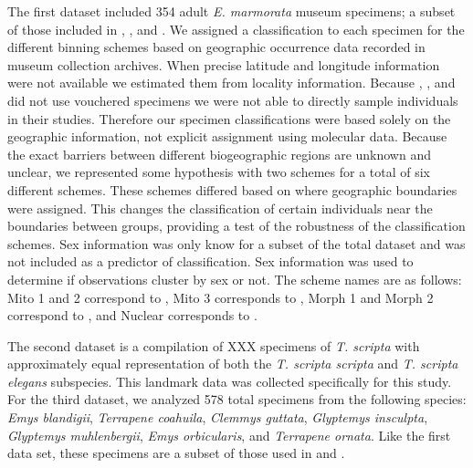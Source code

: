 \documentclass[12pt,letterpaper]{article}
\begin{document}
The first dataset included 354 adult \textit{E. marmorata} museum specimens; a subset of those included in \citet{Angielczyk2007}, \citet{Angielczyk2011}, and \citet{Angielczyk2013a}. We assigned a classification to each specimen for the different binning schemes based on geographic occurrence data recorded in museum collection archives. When precise latitude and longitude information were not available we estimated them from locality information. Because \citet{Spinks2005}, \citet{Spinks2010}, and \citet{Spinks2014} did not use vouchered specimens we were not able to directly sample individuals in their studies. Therefore our specimen classifications were based solely on the geographic information, not explicit assignment using molecular data. Because the exact barriers between different biogeographic regions are unknown and unclear, we represented some hypothesis with two schemes for a total of six different schemes. These schemes differed based on where geographic boundaries were assigned. This changes the classification of certain individuals near the boundaries between groups, providing a test of the robustness of the classification schemes. Sex information was only know for a subset of the total dataset and was not included as a predictor of classification. Sex information was used to determine if observations cluster by sex or not. The scheme names are as follows: Mito 1 and 2 correspond to \citet{Spinks2005}, Mito 3 corresponds to \citet{Spinks2010}, Morph 1 and Morph 2 correspond to \citet{Holland1992}, and Nuclear corresponds to \citet{Spinks2014}. 

The second dataset is a compilation of XXX specimens of \textit{T. scripta} with approximately equal representation of both the \textit{T. scripta scripta} and \textit{T. scripta elegans} subspecies. This landmark data was collected specifically for this study. For the third dataset, we analyzed 578 total specimens from the following species: \textit{Emys blandigii}, \textit{Terrapene coahuila}, \textit{Clemmys guttata}, \textit{Glyptemys insculpta}, \textit{Glyptemys muhlenbergii}, \textit{Emys orbicularis}, and \textit{Terrapene ornata}. Like the first data set, these specimens are a subset of those used in \citet{Angielczyk2011} and \citet{Angielczyk2013a}.
\end{document}
